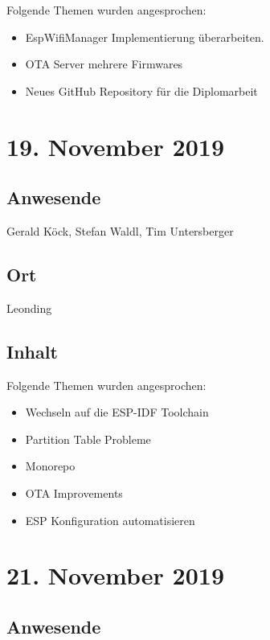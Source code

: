 Folgende Themen wurden angesprochen:

\begin{itemize}
  \item EspWifiManager Implementierung überarbeiten.
  \item OTA Server mehrere Firmwares
  \item Neues GitHub Repository für die Diplomarbeit
\end{itemize}

\pagebreak

\section*{19. November 2019}

\subsection*{Anwesende}

Gerald Köck, Stefan Waldl, Tim Untersberger

\subsection*{Ort}

Leonding

\subsection*{Inhalt}

Folgende Themen wurden angesprochen:

\begin{itemize}
  \item Wechseln auf die ESP-IDF Toolchain
  \item Partition Table Probleme
  \item Monorepo
  \item OTA Improvements
  \item ESP Konfiguration automatisieren
\end{itemize}

\pagebreak

\section*{21. November 2019}

\subsection*{Anwesende}

